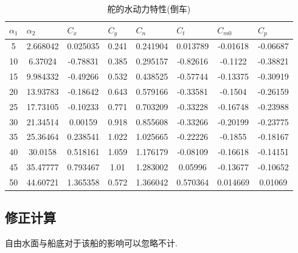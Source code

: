 \documentclass[a4paper,UTF8]{article}
\begin{document}
\begin{table}[htbp]
	\centering
	\begin{tabular}{cccccccc}
		\hline
		\multicolumn{1}{l}{$\alpha_{1}$} & \multicolumn{1}{l}{$\alpha_{2}$} & \multicolumn{1}{l}{$C_{x}$} & \multicolumn{1}{l}{$C_{y}$} & \multicolumn{1}{l}{$C_{n}$} & \multicolumn{1}{l}{$C_{t}$} & \multicolumn{1}{l}{$C_{m0}$} & \multicolumn{1}{l}{$C_p$}\\
		\hline
    5     & 2.668042 & 0.025035 & 0.241 & 0.241904 & 0.013789 & -0.01618 & -0.06687 \\
10    & 6.37024 & -0.78831 & 0.385 & 0.295157 & -0.82616 & -0.1122 & -0.38821 \\
15    & 9.984332 & -0.49266 & 0.532 & 0.438525 & -0.57744 & -0.13375 & -0.30919 \\
20    & 13.93783 & -0.18642 & 0.643 & 0.579166 & -0.33581 & -0.1504 & -0.26159 \\
25    & 17.73105 & -0.10233 & 0.771 & 0.703209 & -0.33228 & -0.16748 & -0.23988 \\
30    & 21.34514 & 0.00159 & 0.918 & 0.855608 & -0.33266 & -0.20199 & -0.23775 \\
35    & 25.36464 & 0.238541 & 1.022 & 1.025665 & -0.22226 & -0.1855 & -0.18167 \\
40    & 30.0158 & 0.518161 & 1.059 & 1.176179 & -0.08109 & -0.16618 & -0.14151 \\
45    & 35.47777 & 0.793467 & 1.01  & 1.283002 & 0.05996 & -0.13677 & -0.10652 \\
50    & 44.60721 & 1.365358 & 0.572 & 1.366042 & 0.570364 & 0.014669 & 0.01069 \\
		\hline
	\end{tabular}
	\caption{舵的水动力特性(倒车)}
	\label{tab:dc}
\end{table}

\subsection{修正计算}
自由水面与船底对于该船的影响可以忽略不计.
\end{document}
